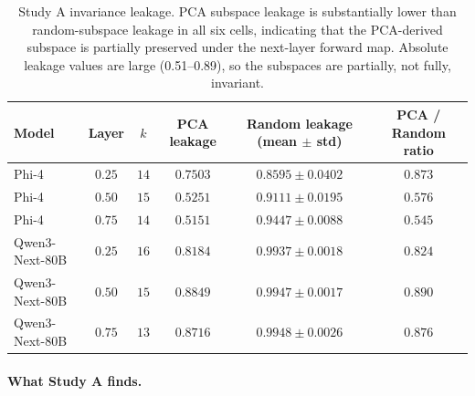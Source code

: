 \begin{table}[h]
\centering
\caption{Study A invariance leakage. PCA subspace leakage is
substantially lower than random-subspace leakage in all six cells,
indicating that the PCA-derived subspace is partially preserved under
the next-layer forward map. Absolute leakage values are large
(0.51--0.89), so the subspaces are partially, not fully, invariant.}
\label{tab:study-a}
\begin{tabular}{l c c c c c}
\toprule
Model & Layer & $k$ & PCA leakage & Random leakage (mean $\pm$ std) & PCA / Random ratio \\
\midrule
Phi-4 & $0.25$ & $14$ & $0.7503$ & $0.8595 \pm 0.0402$ & $0.873$ \\
Phi-4 & $0.50$ & $15$ & $0.5251$ & $0.9111 \pm 0.0195$ & $0.576$ \\
Phi-4 & $0.75$ & $14$ & $0.5151$ & $0.9447 \pm 0.0088$ & $0.545$ \\
Qwen3-Next-80B & $0.25$ & $16$ & $0.8184$ & $0.9937 \pm 0.0018$ & $0.824$ \\
Qwen3-Next-80B & $0.50$ & $15$ & $0.8849$ & $0.9947 \pm 0.0017$ & $0.890$ \\
Qwen3-Next-80B & $0.75$ & $13$ & $0.8716$ & $0.9948 \pm 0.0026$ & $0.876$ \\
\bottomrule
\end{tabular}
\end{table}

\paragraph{What Study A finds.}

